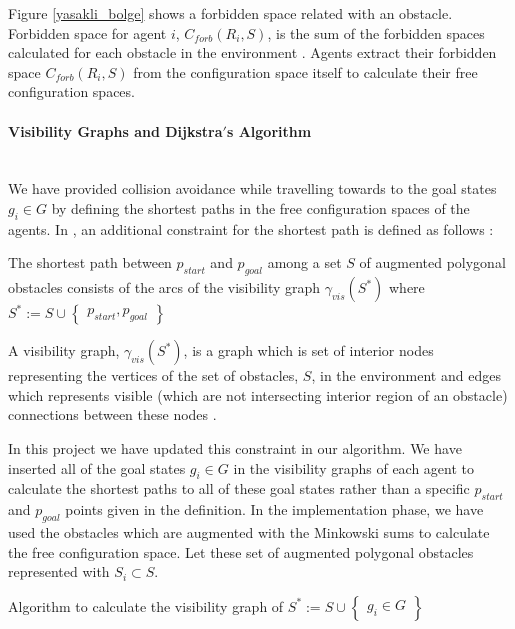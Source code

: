 Figure \ref{yasakli_bolge} shows a forbidden space related with an obstacle. Forbidden space for agent $i$, $C_{forb}(R_i, S)$, is the sum of the forbidden spaces calculated for each obstacle in the environment \cite{92}. Agents extract their forbidden space $C_{forb}(R_i, S)$ from the configuration space itself to calculate their free configuration spaces.
	
\paragraph{Visibility Graphs and Dijkstra$'$s Algorithm}\hspace{0pt} \\
We have provided collision avoidance while travelling towards to the goal states $g_i \in G$ by defining the shortest paths in the free configuration spaces of the agents. In \cite{92}, an additional constraint for the shortest path is defined as follows : 

\begin{displayquote}
The shortest path between $p_{start}$ and $p_{goal}$ among a set $S$ of augmented polygonal obstacles consists of the arcs of the visibility graph $\gamma_{vis}(S^*)$ where $S^* := S \cup \begin{Bmatrix}
p_{start}, p_{goal}
\end{Bmatrix}$
\end{displayquote}

A visibility graph, $\gamma_{vis}(S^*)$, is a graph which is set of interior nodes representing the vertices of the set of obstacles, $S$, in the environment and edges which represents visible (which are not intersecting interior region of an obstacle) connections between these nodes \cite{92}.

In this project we have updated this constraint in our algorithm. We have inserted all of the goal states $g_i \in G$ in the visibility graphs of each agent to calculate the shortest paths to all of these goal states rather than a specific $p_{start}$ and $p_{goal}$ points given in the definition. In the implementation phase, we have used the obstacles which are augmented with the Minkowski sums to calculate the free configuration space. Let these set of augmented polygonal obstacles represented with $S_i \subset S$. 



Algorithm to calculate the visibility graph of  $S^* := S \cup \begin{Bmatrix}
g_i \in G
\end{Bmatrix}$
	
